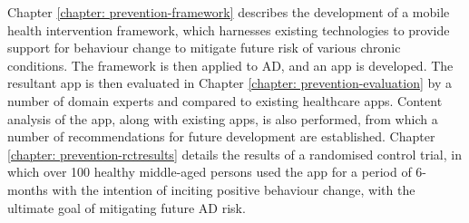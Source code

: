 Chapter \ref{chapter: prevention-framework} describes the development of a mobile health intervention framework, which harnesses existing technologies to provide support for behaviour change to mitigate future risk of various chronic conditions. The framework is then applied to AD, and an app is developed. The resultant app is then evaluated in Chapter \ref{chapter: prevention-evaluation} by a number of domain experts and compared to existing healthcare apps. Content analysis of the app, along with existing apps, is also performed, from which a number of recommendations for future development are established. Chapter \ref{chapter: prevention-rctresults} details the results of a randomised control trial, in which over 100 healthy middle-aged persons used the app for a period of 6-months with the intention of inciting positive behaviour change, with the ultimate goal of mitigating future AD risk.